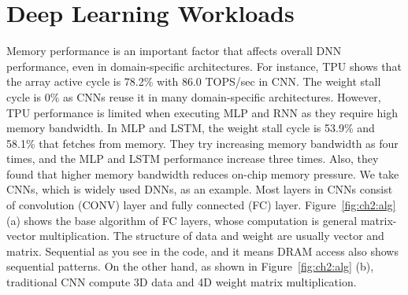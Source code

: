 \section{Deep Learning Workloads}
Memory performance is an important factor that affects overall DNN performance, even in domain-specific architectures. 
For instance, TPU  shows that the array active cycle is 78.2\% with 86.0 TOPS/sec in CNN. 
The weight stall cycle is 0\% as CNNs reuse it in many domain-specific architectures. 
However, TPU performance is limited when executing MLP and RNN as they require high memory bandwidth. 
In MLP and LSTM, the weight stall cycle is 53.9\% and 58.1\% that fetches from memory. 
They try increasing memory bandwidth as four times, and the MLP and LSTM performance increase three times. 
Also, they found that higher memory bandwidth reduces on-chip memory pressure. 
We take CNNs, which is widely used DNNs, as an example. Most layers in CNNs consist of convolution (CONV) layer and fully connected (FC) layer.
Figure~\ref{fig:ch2:alg} (a) shows the base algorithm of FC layers, whose computation is general matrix-vector multiplication. 
The structure of data and weight are usually vector and matrix. Sequential as you see in the code, and it means DRAM access also shows sequential patterns. On the other hand, as shown in Figure~\ref{fig:ch2:alg} (b), traditional CNN compute 3D data and 4D weight matrix multiplication.

